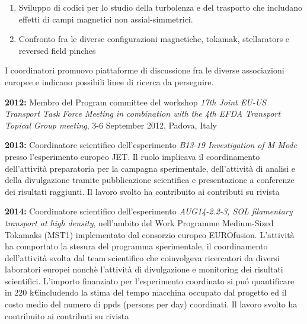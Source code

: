 \begin{enumerate}[label={[E\arabic*]}]
\begin{enumerate}[noitemsep,leftmargin=*,topsep=0pt,partopsep=0pt]
    sistemi 3D, inclusi gli effetti su ioni ed elettroni sovratermici
  \item Sviluppo di codici per lo studio della turbolenza e del
    trasporto che includano effetti di campi magnetici non
    assial-simmetrici.
  \item Confronto fra le diverse configurazioni magnetiche, tokamak,
    stellarators e reversed field pinches
  \end{enumerate}
  I coordinatori promuovo piattaforme di discussione fra le diverse
  associazioni europee e indicano possibili linee di ricerca da
  perseguire.
%
\item \textbf{2012:} Membro del Program committee del workshop
  \emph{17th Joint EU-US Transport Task Force Meeting in combination
    with the 4th EFDA Transport Topical Group meeting}, 3-6 September
  2012, Padova, Italy
%
\item \textbf{2013:} Coordinatore scientifico dell'esperimento
  \emph{B13-19 Investigation of M-Mode} presso l'esperimento europeo
  JET. Il ruolo implicava il coordinamento dell'attivit{\`a}
  preparatoria per la campagna sperimentale, dell'attivit{\`a} di
  analisi e della divulgazione tramite pubblicazione scientifica e
  presentazione a conferenze dei risultati raggiunti. Il lavoro svolto
  ha contribuito ai contributi su rivista  \cite{Solano:2017db,Refy:NuclearFusion2020}
%  
\item \textbf{2014:} Coordinatore scientifico dell'esperimento
  \emph{AUG14-2.2-3, SOL filamentary transport at high density},
  nell'ambito del Work Programme Medium-Sized Tokamaks (MST1)
  implementato dal consorzio europeo EUROfusion. L'attivit{\`a} ha
  comportato la stesura del programma sperimentale, il coordinamento
  dell'attivit{\`a} svolta dal team scientifico che coinvolgeva
  ricercatori da diversi laboratori europei nonch{\`e} l'attivit{\`a}
  di divulgazione e monitoring dei risultati scientifici.
  L'importo finanziato per l'esperimento
  coordinato si pu\'o quantificare in 220 k\euro includendo la stima
  del tempo macchina occupato dal progetto ed il costo
  medio del numero di ppds (persons per day) coordinati. Il lavoro svolto
  ha contribuito ai contributi su rivista \cite{Carralero:2016fs, Carralero:prl2015, Carralero:2017gb}


\end{enumerate}
